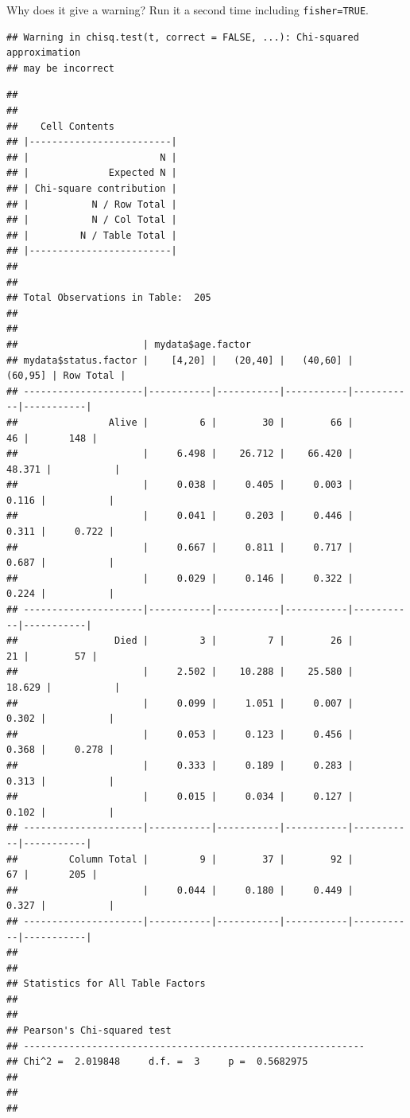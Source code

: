 \documentclass[]{book}
\makeatletter
\newenvironment{Shaded}{\begin{snugshade}}{\end{snugshade}}
\newcommand{\DataTypeTok}[1]{\textcolor[rgb]{0.13,0.29,0.53}{#1}}
\newcommand{\KeywordTok}[1]{\textcolor[rgb]{0.13,0.29,0.53}{\textbf{#1}}}
\newcommand{\NormalTok}[1]{#1}
\newcommand{\OperatorTok}[1]{\textcolor[rgb]{0.81,0.36,0.00}{\textbf{#1}}}
\newcommand{\OtherTok}[1]{\textcolor[rgb]{0.56,0.35,0.01}{#1}}
\newenvironment{kframe}{%
\medskip{}
\setlength{\fboxsep}{.8em}
 \def\at@end@of@kframe{}%
 \ifinner\ifhmode%
  \def\at@end@of@kframe{\end{minipage}}%
  \begin{minipage}{\columnwidth}%
 \fi\fi%
 \def\FrameCommand##1{\hskip\@totalleftmargin \hskip-\fboxsep
 \colorbox{shadecolor}{##1}\hskip-\fboxsep
     \hskip-\linewidth \hskip-\@totalleftmargin \hskip\columnwidth}%
 \MakeFramed {\advance\hsize-\width
   \@totalleftmargin\z@ \linewidth\hsize
   \@setminipage}}%
 {\par\unskip\endMakeFramed%
 \at@end@of@kframe}
\renewenvironment{Shaded}{\begin{kframe}}{\end{kframe}}
\theoremstyle{definition}
\theoremstyle{definition}
\theoremstyle{definition}
\theoremstyle{remark}
\makeatother
\begin{document}
Why does it give a warning? Run it a second time including
\texttt{fisher=TRUE}.

\begin{Shaded}
\end{Shaded}

\begin{verbatim}
## Warning in chisq.test(t, correct = FALSE, ...): Chi-squared approximation
## may be incorrect
\end{verbatim}

\begin{verbatim}
## 
##  
##    Cell Contents
## |-------------------------|
## |                       N |
## |              Expected N |
## | Chi-square contribution |
## |           N / Row Total |
## |           N / Col Total |
## |         N / Table Total |
## |-------------------------|
## 
##  
## Total Observations in Table:  205 
## 
##  
##                      | mydata$age.factor 
## mydata$status.factor |    [4,20] |   (20,40] |   (40,60] |   (60,95] | Row Total | 
## ---------------------|-----------|-----------|-----------|-----------|-----------|
##                Alive |         6 |        30 |        66 |        46 |       148 | 
##                      |     6.498 |    26.712 |    66.420 |    48.371 |           | 
##                      |     0.038 |     0.405 |     0.003 |     0.116 |           | 
##                      |     0.041 |     0.203 |     0.446 |     0.311 |     0.722 | 
##                      |     0.667 |     0.811 |     0.717 |     0.687 |           | 
##                      |     0.029 |     0.146 |     0.322 |     0.224 |           | 
## ---------------------|-----------|-----------|-----------|-----------|-----------|
##                 Died |         3 |         7 |        26 |        21 |        57 | 
##                      |     2.502 |    10.288 |    25.580 |    18.629 |           | 
##                      |     0.099 |     1.051 |     0.007 |     0.302 |           | 
##                      |     0.053 |     0.123 |     0.456 |     0.368 |     0.278 | 
##                      |     0.333 |     0.189 |     0.283 |     0.313 |           | 
##                      |     0.015 |     0.034 |     0.127 |     0.102 |           | 
## ---------------------|-----------|-----------|-----------|-----------|-----------|
##         Column Total |         9 |        37 |        92 |        67 |       205 | 
##                      |     0.044 |     0.180 |     0.449 |     0.327 |           | 
## ---------------------|-----------|-----------|-----------|-----------|-----------|
## 
##  
## Statistics for All Table Factors
## 
## 
## Pearson's Chi-squared test 
## ------------------------------------------------------------
## Chi^2 =  2.019848     d.f. =  3     p =  0.5682975 
## 
## 
## 
\end{verbatim}
\end{document}
